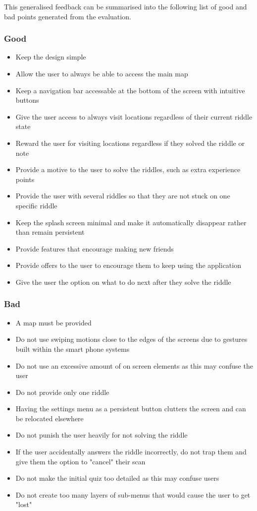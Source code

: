 \documentclass[10pt,twocolumn]{article} %
\begin{document}
This generalised feedback can be summarised into the following list of good and bad points generated from the evaluation.

\subsubsection*{Good}
\begin{itemize}[noitemsep]
  \item Keep the design simple
  \item Allow the user to always be able to access the main map
  \item Keep a navigation bar accessable at the bottom of the screen with intuitive buttons
  \item Give the user access to always visit locations regardless of their current riddle state
  \item Reward the user for visiting locations regardless if they solved the riddle or note
  \item Provide a motive to the user to solve the riddles, such as extra experience points
  \item Provide the user with several riddles so that they are not stuck on one specific riddle
  \item Keep the splash screen minimal and make it automatically disappear rather than remain persistent
  \item Provide features that encourage making new friends
  \item Provide offers to the user to encourage them to keep using the application
  \item Give the user the option on what to do next after they solve the riddle
\end{itemize}

\subsubsection*{Bad}
\begin{itemize}[noitemsep]
  \item A map must be provided
  \item Do not use swiping motions close to the edges of the screens due to gestures built within the smart phone systems
  \item Do not use an excessive amount of on screen elements as this may confuse the user
  \item Do not provide only one riddle
  \item Having the settings menu as a persistent button clutters the screen and can be relocated elsewhere
  \item Do not punish the user heavily for not solving the riddle
  \item If the user accidentally answers the riddle incorrectly, do not trap them and give them the option to "cancel" their scan
  \item Do not make the initial quiz too detailed as this may confuse users
  \item Do not create too many layers of sub-menus that would cause the user to get "lost"
\end{itemize}
\end{document}
